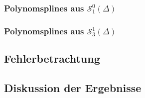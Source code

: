 \documentclass[ngerman,a4paper]{texmf/tex/latex/mathscript/mathscript}
\begin{document}
	\subsubsection{Polynomsplines aus $\mathcal{S}_1^0(\Delta)$}
	
	\subsubsection{Polynomsplines aus $\mathcal{S}_3^1(\Delta)$}
	
	\subsection{Fehlerbetrachtung}
	
	\subsection{Diskussion der Ergebnisse}
\end{document}
